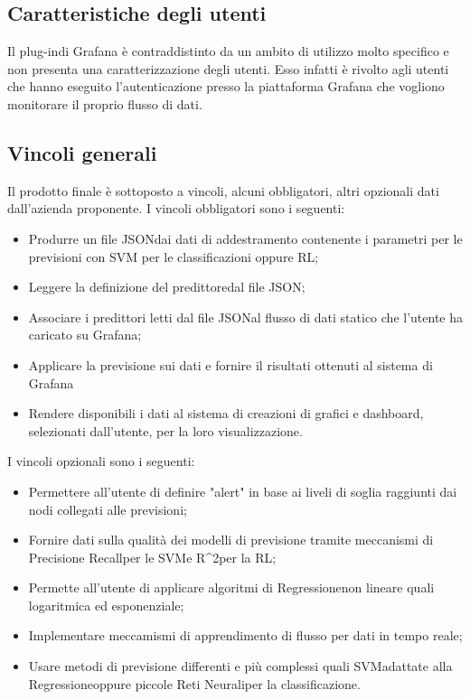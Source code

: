 	\subsection{Caratteristiche degli utenti}
	Il plug-in\glosp di Grafana è contraddistinto da un ambito di utilizzo molto specifico e non presenta una caratterizzazione degli utenti. Esso infatti è rivolto agli utenti che hanno eseguito l'autenticazione presso la piattaforma Grafana che vogliono monitorare il proprio flusso di dati.
	\subsection{Vincoli generali}
	Il prodotto finale è sottoposto a vincoli, alcuni obbligatori, altri opzionali dati dall'azienda proponente.
	I vincoli obbligatori sono i seguenti:
	\begin{itemize}
		\item Produrre un file JSON\glosp dai dati di addestramento contenente i parametri per le previsioni con SVM per le classificazioni oppure RL;
		\item Leggere la definizione del predittore\glosp dal file JSON\glo;
		\item Associare i predittori letti dal file JSON\glosp al flusso di dati statico che l'utente ha caricato su Grafana;
		\item Applicare la previsione sui dati e fornire il risultati ottenuti al sistema di Grafana
		\item Rendere disponibili i dati al sistema di creazioni di grafici e dashboard, selezionati dall'utente, per la loro visualizzazione.
	\end{itemize}
	I vincoli opzionali sono i seguenti:
	\begin{itemize}
		\item Permettere all'utente di definire "alert" in base ai liveli di soglia raggiunti dai nodi collegati alle previsioni;
		\item Fornire dati sulla qualità dei modelli di previsione tramite meccanismi di Precision\glosp e Recall\glosp per le SVM\glosp e R^2\glosp per la RL\glo;
		\item Permette all'utente di applicare algoritmi di Regressione\glosp non lineare quali logaritmica ed esponenziale;
		\item Implementare meccamismi di apprendimento di flusso per dati in tempo reale;
		\item Usare metodi di previsione differenti e più complessi quali SVM\glosp adattate alla Regressione\glosp oppure piccole Reti Neurali\glosp per la classificazione\glo.
	\end{itemize}